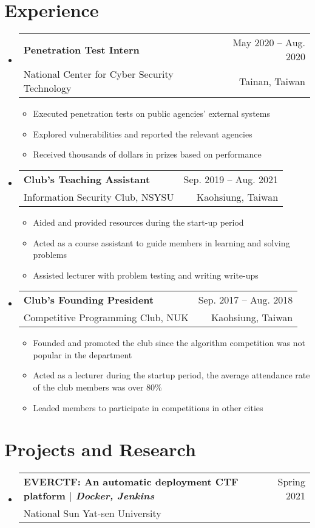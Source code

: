 \documentclass[A4,11pt]{article}
\makeatletter
\newcommand{\CVItem}[1]{
  \item\small{
    {#1 \vspace{-2pt}}
  }
}
\newcommand{\CVSubheading}[4]{
  \vspace{-2pt}\item
    \begin{tabular*}{0.97\textwidth}[t]{l@{\extracolsep{\fill}}r}
      \textbf{#1} & #2 \\
      \small#3 & \small #4 \\
    \end{tabular*}\vspace{-7pt}
}
\newcommand{\CVSubHeadingListStart}{\begin{itemize}[leftmargin=0.5cm, label={}]}
\newcommand{\CVSubHeadingListEnd}{\end{itemize}}
\newcommand{\CVItemListStart}{\begin{itemize}}
\newcommand{\CVItemListEnd}{\end{itemize}\vspace{-5pt}}
\makeatother
\begin{document}
  \section{Experience}
    \CVSubHeadingListStart
      \CVSubheading
        {Penetration Test Intern}{May 2020 -- Aug. 2020}
        {National Center for Cyber Security Technology}{Tainan, Taiwan}
        \CVItemListStart
          \CVItem{Executed penetration tests on public agencies' external systems}
          \CVItem{Explored vulnerabilities and reported the relevant agencies}
          \CVItem{Received thousands of dollars in prizes based on performance}
        \CVItemListEnd
      \CVSubheading
        {Club's Teaching Assistant}{Sep. 2019 -- Aug. 2021}
        {Information Security Club, NSYSU}{Kaohsiung, Taiwan}
        \CVItemListStart
          \CVItem{Aided and provided resources during the start-up period}
          \CVItem{Acted as a course assistant to guide members in learning and solving problems}
          \CVItem{Assisted lecturer with problem testing and writing write-ups}
        \CVItemListEnd
      \CVSubheading
        {Club's Founding President}{Sep. 2017 -- Aug. 2018}
        {Competitive Programming Club, NUK}{Kaohsiung, Taiwan}
        \CVItemListStart
          \CVItem{Founded and promoted the club since the algorithm competition was not popular in the department}
          \CVItem{Acted as a lecturer during the startup period, the average attendance rate of the club members was over 80\%}
          \CVItem{Leaded members to participate in competitions in other cities}
        \CVItemListEnd
    \CVSubHeadingListEnd

\begin{comment}
  Ideally the title of the work should speak for what it is. However if you feel
  like you should explain more about why the project is applicable to this job,
  use item list as is shown in the work experience section.
  \end{comment}
  
  \section{Projects and Research}
    \CVSubHeadingListStart
      \CVSubheading
        {EVERCTF: An automatic deployment CTF platform $|$ \emph{\small{Docker, Jenkins}}}{Spring 2021}
        {National Sun Yat-sen University}{}
    \CVSubHeadingListEnd
\end{document}
